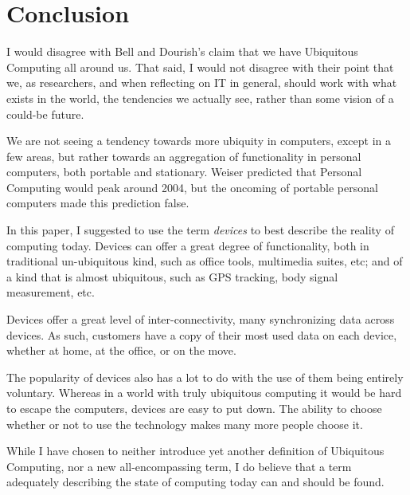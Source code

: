 \section{Conclusion}

I would disagree with Bell and Dourish's claim that we have Ubiquitous Computing all around us. That said, I would not disagree
with their point that we, as researchers, and when reflecting on IT in general, should work with what exists in the world, the tendencies we actually see, rather than some vision of
a could-be future.

We are not seeing a tendency towards more ubiquity in computers, except in a few areas, but rather towards an aggregation of
functionality in personal computers, both portable and stationary. Weiser predicted that Personal Computing would peak around
2004, but the oncoming of portable personal computers made this prediction false.

In this paper, I suggested to use the term \emph{devices} to best describe the reality of computing today. Devices can offer a
great degree of functionality, both in traditional un-ubiquitous kind, such as office tools, multimedia suites, etc;
and of a kind that is almost ubiquitous, such as GPS tracking, body signal measurement, etc.

Devices offer a great level of inter-connectivity, many synchronizing data across devices. As such, customers have a copy of their
most used data on each device, whether at home, at the office, or on the move.

The popularity of devices also has a lot to do with the use of them being entirely voluntary. Whereas in a world with truly ubiquitous
computing it would be hard to escape the computers, devices are easy to put down. The ability to choose whether or not to use the
technology makes many more people choose it.

While I have chosen to neither introduce yet another definition of Ubiquitous Computing, nor a new all-encompassing term,
I do believe that a term adequately describing the state of computing today can and should be found.
